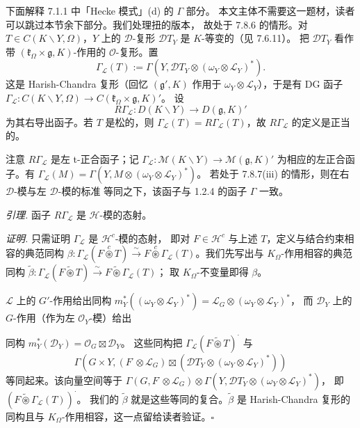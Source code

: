  下面解释 7.1.1 中「Hecke 模式」(d) 的 $\Gamma$ 部分。
本文主体不需要这一题材，读者可以跳过本节余下部分。我们处理扭的版本，
故处于 7.8.6 的情形。对 $T\in C(K\backslash Y,\Omega)$，$Y$ 上的
$\mathcal{D}$-复形 $\mathcal{D}T_{Y}$ 是 $K$-等变的（见 7.6.11）。
把 $\mathcal{D}T_{Y}$ 看作带 $(\mathfrak{k}_{\Omega}\times\mathfrak{g},K)$-作用的
$\mathcal{O}$-复形。置
\[
\Gamma_{\mathcal{L}}(T):=\Gamma(Y,\mathcal{D}T_{Y}\otimes(\omega_{Y}\otimes\mathcal{L}_{Y})^{*}).
\]
这是 Harish-Chandra 复形（回忆 $(\mathfrak{g}',K)$ 作用于
$\omega_{Y}\otimes\mathcal{L}_{Y}$），于是有 DG 函子
$\Gamma_{\mathcal{L}}:C(K\backslash Y,\Omega)\to C(\mathfrak{k}_{\Omega}\times\mathfrak{g},K)'$。
设
\[
R\Gamma_{\mathcal{L}}:D(K\backslash Y)\to D(\mathfrak{g},K)'
\]
为其右导出函子。若 $T$ 是松的，则
$\Gamma_{\mathcal{L}}(T)=R\Gamma_{\mathcal{L}}(T)$，故 $R\Gamma_{\mathcal{L}}$
的定义是正当的。

注意 $R\Gamma_{\mathcal{L}}$ 是左 t-正合函子；记
$\Gamma_{\mathcal{L}}:\mathcal{M}(K\backslash Y)\to\mathcal{M}(\mathfrak{g},K)'$
为相应的左正合函子。有
$\Gamma_{\mathcal{L}}(M)=\Gamma(Y,M\otimes(\omega_{Y}\otimes\mathcal{L}_{Y})^{*})$。
若处于 7.8.7(iii) 的情形，则在右 $\mathcal{D}$-模与左 $\mathcal{D}$-模的标准
等同之下，该函子与 1.2.4 的函子 $\Gamma$ 一致。

 \emph{引理.} 函子 $R\Gamma_{\mathcal{L}}$ 是 $\mathcal{H}$-模的态射。

\emph{证明.} 只需证明 $\Gamma_{\mathcal{L}}$ 是 $\mathcal{H}^{c}$-模的态射，
即对 $F\in\mathcal{H}^{c}$ 与上述 $T$，定义与结合约束相容的典范同构
$\beta:\Gamma_{\mathcal{L}}(F\overset{c}{\circledast}T)\xrightarrow{\sim}
F\overset{c}{\circledast}\Gamma_{\mathcal{L}}(T)$。我们先写出与
$K_{\Omega}$-作用相容的典范同构
$\tilde{\beta}:\Gamma_{\mathcal{L}}(F\widetilde{\circledast}T)
\xrightarrow{\sim}F\widetilde{\circledast}\Gamma_{\mathcal{L}}(T)$；
取 $K_{\Omega}$-不变量即得 $\beta$。

$\mathcal{L}$ 上的 $G'$-作用给出同构
$m_{Y}^{*}((\omega_{Y}\otimes\mathcal{L}_{Y})^{*})
=\mathcal{L}_{G}\otimes(\omega_{Y}\otimes\mathcal{L}_{Y})^{*}$，
而 $\mathcal{D}_{Y}$ 上的 $G$-作用（作为左 $\mathcal{O}_{Y}$-模）给出


同构 $m_{Y}^{*}(\mathcal{D}_{Y})=\mathcal{O}_{G}\boxtimes\mathcal{D}_{Y}$。
这些同构把 $\Gamma_{\mathcal{L}}(F\widetilde{\circledast}T)^{\cdot}$ 与
\[
\Gamma(G\times Y,(F^{\cdot}\otimes\mathcal{L}_{G})\boxtimes
(\mathcal{D}T_{Y}^{\cdot}\otimes(\omega_{Y}\otimes\mathcal{L}_{Y})^{*}))
\]
等同起来。该向量空间等于
$\Gamma(G,F^{\cdot}\otimes\mathcal{L}_{G})\otimes
\Gamma(Y,\mathcal{D}T_{Y}^{\cdot}\otimes(\omega_{Y}\otimes\mathcal{L}_{Y})^{*})$，
即 $(F\widetilde{\circledast}\Gamma_{\mathcal{L}}(T))^{\cdot}$。
我们的 $\tilde{\beta}$ 就是这些等同的复合。$\tilde{\beta}$ 是 Harish-Chandra
复形的同构且与 $K_{\Omega}$-作用相容，这一点留给读者验证。\hfill$\square$


